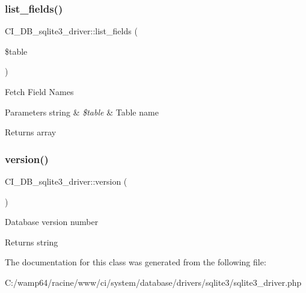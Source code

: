 \subsubsection{\texorpdfstring{list\+\_\+fields()}{list\_fields()}}
{\footnotesize\ttfamily C\+I\+\_\+\+D\+B\+\_\+sqlite3\+\_\+driver\+::list\+\_\+fields (\begin{DoxyParamCaption}\item[{}]{\$table }\end{DoxyParamCaption})}

Fetch Field Names


\begin{DoxyParams}[1]{Parameters}
string & {\em \$table} & Table name \\
\hline
\end{DoxyParams}
\begin{DoxyReturn}{Returns}
array 
\end{DoxyReturn}
\mbox{\label{class_c_i___d_b__sqlite3__driver_a51192c547746f00de4da54cc925bc1ab}} 
\subsubsection{\texorpdfstring{version()}{version()}}
{\footnotesize\ttfamily C\+I\+\_\+\+D\+B\+\_\+sqlite3\+\_\+driver\+::version (\begin{DoxyParamCaption}{ }\end{DoxyParamCaption})}

Database version number

\begin{DoxyReturn}{Returns}
string 
\end{DoxyReturn}


The documentation for this class was generated from the following file\+:\begin{DoxyCompactItemize}
\item 
C\+:/wamp64/racine/www/ci/system/database/drivers/sqlite3/sqlite3\+\_\+driver.\+php\end{DoxyCompactItemize}
